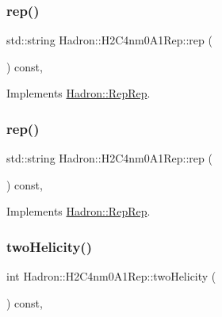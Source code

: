 \subsubsection{\texorpdfstring{rep()}{rep()}\hspace{0.1cm}{\footnotesize\ttfamily [4/5]}}
{\footnotesize\ttfamily std\+::string Hadron\+::\+H2\+C4nm0\+A1\+Rep\+::rep (\begin{DoxyParamCaption}{ }\end{DoxyParamCaption}) const\hspace{0.3cm}{\ttfamily [inline]}, {\ttfamily [virtual]}}



Implements \mbox{\hyperlink{structHadron_1_1RepRep_ab3213025f6de249f7095892109575fde}{Hadron\+::\+Rep\+Rep}}.

\mbox{\label{structHadron_1_1H2C4nm0A1Rep_af78536d0069f367b69654854815b015d}} 
\subsubsection{\texorpdfstring{rep()}{rep()}\hspace{0.1cm}{\footnotesize\ttfamily [5/5]}}
{\footnotesize\ttfamily std\+::string Hadron\+::\+H2\+C4nm0\+A1\+Rep\+::rep (\begin{DoxyParamCaption}{ }\end{DoxyParamCaption}) const\hspace{0.3cm}{\ttfamily [inline]}, {\ttfamily [virtual]}}



Implements \mbox{\hyperlink{structHadron_1_1RepRep_ab3213025f6de249f7095892109575fde}{Hadron\+::\+Rep\+Rep}}.

\mbox{\label{structHadron_1_1H2C4nm0A1Rep_aa238eba0bfb059bc24baca59a75c48af}} 
\subsubsection{\texorpdfstring{twoHelicity()}{twoHelicity()}\hspace{0.1cm}{\footnotesize\ttfamily [1/3]}}
{\footnotesize\ttfamily int Hadron\+::\+H2\+C4nm0\+A1\+Rep\+::two\+Helicity (\begin{DoxyParamCaption}{ }\end{DoxyParamCaption}) const\hspace{0.3cm}{\ttfamily [inline]}, {\ttfamily [virtual]}}

